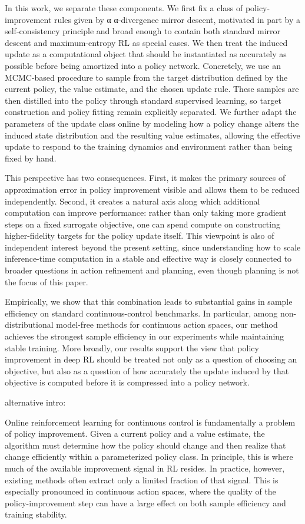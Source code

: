 \documentclass{article}
\theoremstyle{plain}
\theoremstyle{definition}
\theoremstyle{remark}
\begin{document}
In this work, we separate these components. We first fix a class of policy-improvement rules given by 
α
α-divergence mirror descent, motivated in part by a self-consistency principle and broad enough to contain both standard mirror descent and maximum-entropy RL as special cases. We then treat the induced update as a computational object that should be instantiated as accurately as possible before being amortized into a policy network. Concretely, we use an MCMC-based procedure to sample from the target distribution defined by the current policy, the value estimate, and the chosen update rule. These samples are then distilled into the policy through standard supervised learning, so target construction and policy fitting remain explicitly separated. We further adapt the parameters of the update class online by modeling how a policy change alters the induced state distribution and the resulting value estimates, allowing the effective update to respond to the training dynamics and environment rather than being fixed by hand.

This perspective has two consequences. First, it makes the primary sources of approximation error in policy improvement visible and allows them to be reduced independently. Second, it creates a natural axis along which additional computation can improve performance: rather than only taking more gradient steps on a fixed surrogate objective, one can spend compute on constructing higher-fidelity targets for the policy update itself. This viewpoint is also of independent interest beyond the present setting, since understanding how to scale inference-time computation in a stable and effective way is closely connected to broader questions in action refinement and planning, even though planning is not the focus of this paper.

Empirically, we show that this combination leads to substantial gains in sample efficiency on standard continuous-control benchmarks. In particular, among non-distributional model-free methods for continuous action spaces, our method achieves the strongest sample efficiency in our experiments while maintaining stable training. More broadly, our results support the view that policy improvement in deep RL should be treated not only as a question of choosing an objective, but also as a question of how accurately the update induced by that objective is computed before it is compressed into a policy network.

alternative intro:

Online reinforcement learning for continuous control is fundamentally a problem of policy improvement. Given a current policy and a value estimate, the algorithm must determine how the policy should change and then realize that change efficiently within a parameterized policy class. In principle, this is where much of the available improvement signal in RL resides. In practice, however, existing methods often extract only a limited fraction of that signal. This is especially pronounced in continuous action spaces, where the quality of the policy-improvement step can have a large effect on both sample efficiency and training stability.
\end{document}
